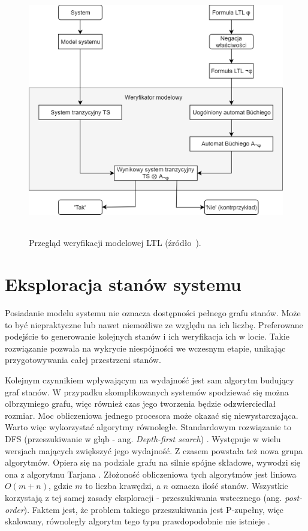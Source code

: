 \begin{figure}[h]
    \centering
    \includegraphics[height=11cm,keepaspectratio]{img/ltl_model_checking_overview.png}
    \caption{Przegląd weryfikacji modelowej LTL (źródło~\cite{Bai08}).}
    \label{fig:ltl_model_checking}
\end{figure}


\section{Eksploracja stanów systemu}

Posiadanie modelu systemu nie oznacza dostępności pełnego grafu stanów.
Może to być niepraktyczne lub nawet niemożliwe ze względu na ich liczbę.
Preferowane podejście to generowanie kolejnych stanów i ich weryfikacja ich w locie.
Takie rozwiązanie pozwala na wykrycie niespójności we wczesnym etapie, unikając przygotowywania całej przestrzeni stanów.

Kolejnym czynnikiem wpływającym na wydajność jest sam algorytm budujący graf stanów.
W przypadku skomplikowanych systemów spodziewać się można olbrzymiego grafu, więc również czas jego tworzenia będzie odzwierciedlał rozmiar.
Moc obliczeniowa jednego procesora może okazać się niewystarczająca.
Warto więc wykorzystać algorytmy równoległe.
Standardowym rozwiązanie to DFS (przeszukiwanie w głąb - ang. \textit{Depth-first search}) \cite{God94}\cite{Hol99}.
Występuje w wielu wersjach mających zwiększyć jego wydajność.
Z czasem powstała też nowa grupa algorytmów.
Opiera się na podziale grafu na silnie spójne składowe, wywodzi się ona z algorytmu Tarjana \cite{Jac05}.
Złożoność obliczeniowa tych algorytmów jest liniowa $O(m + n)$, gdzie $m$ to liczba krawędzi, a $n$ oznacza ilość stanów.
Wszystkie korzystają z tej samej zasady eksploracji - przeszukiwania wstecznego (ang. \textit{post-order}).
Faktem jest, że problem takiego przeszukiwania jest P-zupełny, więc skalowany, równoległy algorytm tego typu prawdopodobnie nie istnieje \cite{Reif85}.

